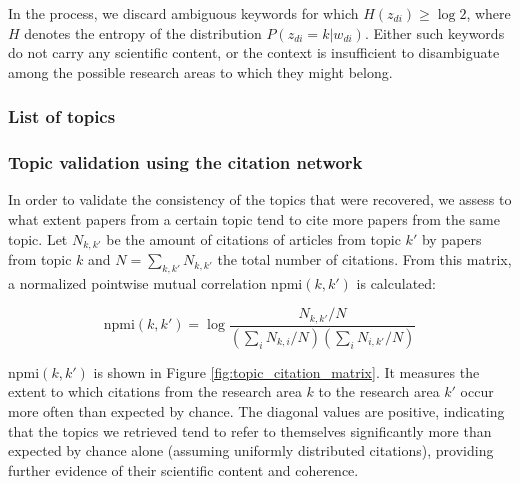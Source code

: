\documentclass{article}
\begin{document}
In the process, we discard ambiguous keywords for which $H(z_{di})\geq \log{2}$, where $H$ denotes the entropy of the distribution $P(z_{di}=k|w_{di})$. Either such keywords do not carry any scientific content, or the context is insufficient to disambiguate among the possible research areas to which they might belong.

\subsubsection{List of topics}

\fontsize{6}{7}\selectfont\normalsize

\subsubsection{\label{appendix:citation_validation}Topic validation using the citation network}

In order to validate the consistency of the topics that were recovered, we assess to what extent papers from a certain topic tend to cite more papers from the same topic. Let $N_{k,k'}$ be the amount of citations of articles from topic $k'$ by papers from topic $k$ and $N=\sum_{k,k'}N_{k,k'}$ the total number of citations. From this matrix, a normalized pointwise mutual correlation $\mathrm{npmi}(k,k')$ is calculated:

\begin{equation}
    \mathrm{npmi}(k,k') = \log {\dfrac{N_{k,k'}/N}{(\sum_{i} N_{k,i}/N)(\sum_{i} N_{i,k'}/N)}}
\end{equation}

$\mathrm{npmi}(k,k')$ is shown in Figure \ref{fig:topic_citation_matrix}. It measures the extent to which citations from the research area $k$ to the research area $k'$ occur more often than expected by chance. The diagonal values are positive, indicating that the topics we retrieved tend to refer to themselves significantly more than expected by chance alone (assuming uniformly distributed citations), providing further evidence of their scientific content and coherence.
\end{document}

